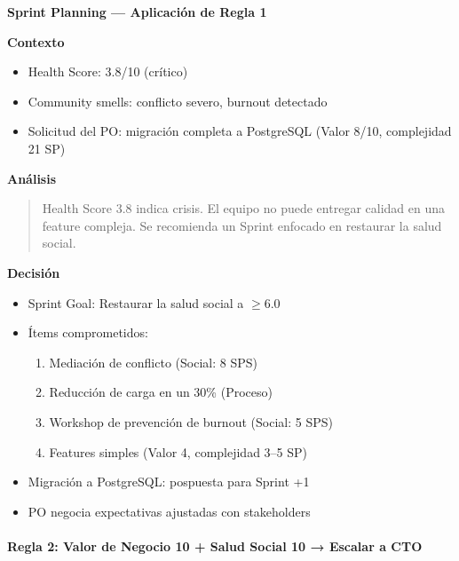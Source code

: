 \begin{escenario}
    \label{esc:sprint-crisis-social}
    \textbf{Sprint Planning — Aplicación de Regla 1}

    \medskip
    \textbf{Contexto}
    \begin{itemize}
        \item Health Score: 3.8/10 (crítico)
        \item Community smells: conflicto severo, burnout detectado
        \item Solicitud del PO: migración completa a PostgreSQL
              (Valor 8/10, complejidad 21 SP)
    \end{itemize}

    \textbf{Análisis}
    \begin{quote}
        Health Score 3.8 indica crisis. El equipo no puede entregar calidad
        en una feature compleja. Se recomienda un Sprint enfocado en
        restaurar la salud social.
    \end{quote}

    \textbf{Decisión}
    \begin{itemize}
        \item Sprint Goal: Restaurar la salud social a $\geq 6.0$
        \item Ítems comprometidos:
              \begin{enumerate}
                  \item Mediación de conflicto (Social: 8 SPS)
                  \item Reducción de carga en un 30\% (Proceso)
                  \item Workshop de prevención de burnout (Social: 5 SPS)
                  \item Features simples (Valor 4, complejidad 3–5 SP)
              \end{enumerate}
        \item Migración a PostgreSQL: pospuesta para Sprint +1
        \item PO negocia expectativas ajustadas con stakeholders
    \end{itemize}

\end{escenario}

\paragraph{Regla 2: Valor de Negocio 10 + Salud Social 10 → Escalar a CTO}

